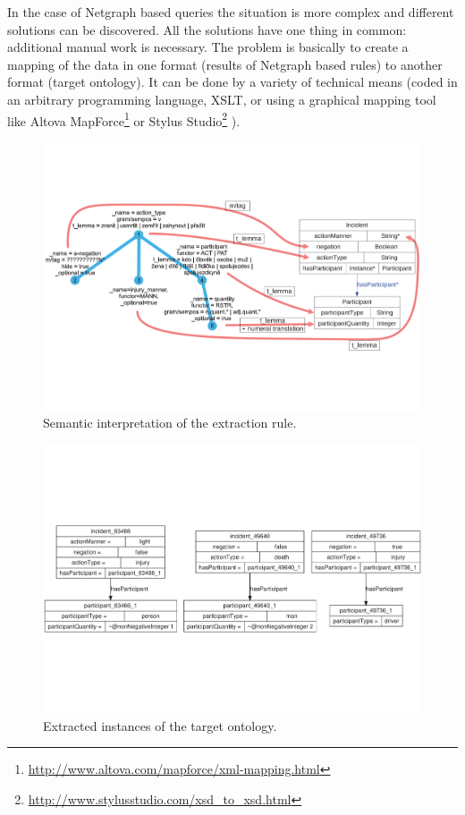In the case of Netgraph based queries the situation is more complex and different solutions can be discovered. All the solutions have one thing in common: additional manual work is necessary. The problem is basically to create a mapping of the data in one format (results of Netgraph based rules) to another format (target ontology). It can be done by a variety of technical means (coded in an arbitrary programming language, XSLT, or using a graphical mapping tool like 
Altova MapForce\footnote{\url{http://www.altova.com/mapforce/xml-mapping.html}}
or
Stylus Studio\footnote{\url{http://www.stylusstudio.com/xsd_to_xsd.html}}
). 



\begin{figure}
	\centering
		\includegraphics[angle=-90, width=0.9\hsize]{semantic_interpretation}
	\caption{Semantic interpretation of the extraction rule.}
	\label{fig:ch50_semantic_interpretation}
\end{figure}


\begin{figure}
	\centering
		\includegraphics[angle=-90, width=\hsize]{instances}
	\caption{Extracted instances of the target ontology.}
	\label{fig:ch50_instatnces}
\end{figure}

